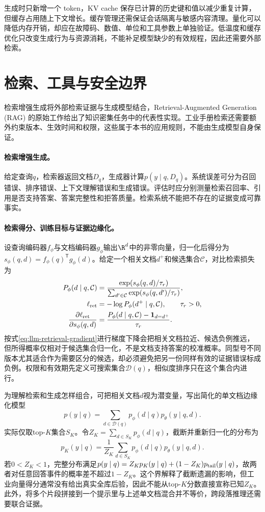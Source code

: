 生成时只新增一个 token，KV cache 保存已计算的历史键和值以减少重复计算，但缓存占用随上下文增长。缓存管理还需保证会话隔离与敏感内容清理。量化可以降低内存开销，却应在故障码、数值、单位和工具参数上单独验证。低温度和缓存优化只改变生成行为与资源消耗，不能补足模型缺少的有效规程，因此还需要外部检索。

\section{检索、工具与安全边界}
检索增强生成将外部检索证据与生成模型结合，Retrieval-Augmented Generation (RAG) 的原始工作给出了知识密集任务中的代表性实现\cite{lewis2020rag}。工业手册检索还需要额外约束版本、生效时间和权限，这些属于本书的应用规则，不能由生成模型自身保证。
\paragraph{检索增强生成。}
给定查询$q$，检索器返回文档$D_q$，生成器计算$p(y\mid q,D_q)$。系统误差可分为召回错误、排序错误、上下文理解错误和生成错误。评估时应分别测量检索召回率、引用是否支持答案、答案完整性和拒答质量。检索系统不能把不存在的证据变成可靠事实。

\paragraph{检索得分、训练目标与证据边缘化。}
设查询编码器$f_\phi$与文档编码器$g_\phi$输出$\R^d$中的非零向量，归一化后得分为$s_\phi(q,d)=f_\phi(q)^{\mathsf T}g_\phi(d)$。给定一个相关文档$d^+$和候选集合$\mathcal C$，对比检索损失为
\begin{align}
 P_\phi(d\mid q,\mathcal C)&=\frac{\exp(s_\phi(q,d)/\tau_r)}{\sum_{d'\in\mathcal C}\exp(s_\phi(q,d')/\tau_r)},\\
 \ell_{\rm ret}&=-\log P_\phi(d^+\mid q,\mathcal C),\qquad \tau_r>0,\\
 \frac{\partial\ell_{\rm ret}}{\partial s_\phi(q,d)}&=\frac{P_\phi(d\mid q,\mathcal C)-\mathbf1_{d=d^+}}{\tau_r}.\label{eq:llm-retrieval-gradient}
\end{align}
按式\eqref{eq:llm-retrieval-gradient}进行梯度下降会把相关文档拉近、候选负例推远，但所得概率仅相对于候选集合归一化，不是文档支持答案的校准概率。同型号不同版本尤其适合作为需要区分的候选，却必须避免把另一份同样有效的证据错误标成负例。权限和有效期先定义可搜索集合$\mathcal D(q)$，相似度排序只在这个集合内进行。

为理解检索和生成怎样组合，可把相关文档$d$视为潜变量，写出简化的单文档边缘化模型
\begin{equation}
 p(y\mid q)=\sum_{d\in\mathcal D(q)}p_\phi(d\mid q)p_\theta(y\mid q,d).
\end{equation}
实际仅取top-$K$集合$S_K$。令$Z_K=\sum_{d\in S_K}p_\phi(d\mid q)$，截断并重新归一化的分布为
\begin{equation}
 p_K(y\mid q)=\frac1{Z_K}\sum_{d\in S_K}p_\phi(d\mid q)p_\theta(y\mid q,d).
\end{equation}
若$0<Z_K<1$，完整分布满足$p(y\mid q)=Z_Kp_K(y\mid q)+(1-Z_K)p_{\rm tail}(y\mid q)$，故两者对任意回答事件的概率差不超过$1-Z_K$。这个界解释了截断遗漏的影响，但工业向量得分通常没有给出真实全库后验，因此不能从top-$K$分数直接宣称已知$Z_K$。此外，将多个片段拼接到一个提示里与上述单文档混合并不等价，跨段落推理还需要联合证据。


